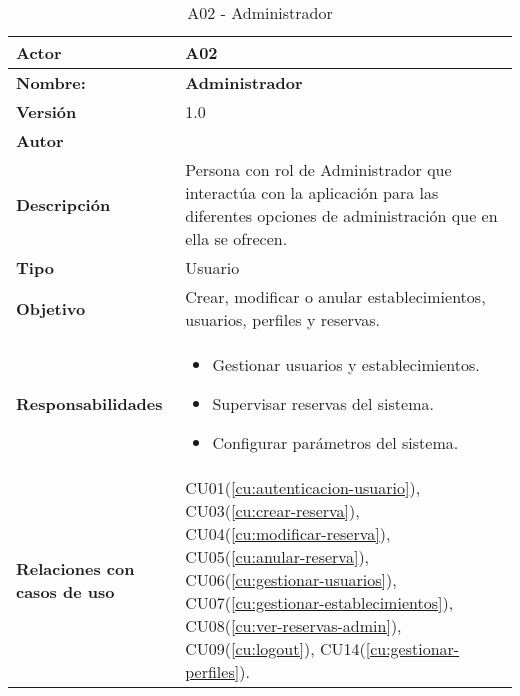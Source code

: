 \begin{table}[H]
	\centering
	\begin{tabularx}{\linewidth}{ p{} p{} }
		\toprule
		\textbf{Actor}    & A02 \\
		\toprule
		\textbf{Nombre:} 			  & \textbf{Administrador} \\
		\textbf{Versión}              & 1.0    \\
		\textbf{Autor}                & \nombre \\
		\textbf{Descripción}          & Persona con rol de Administrador que interactúa con la aplicación para las diferentes opciones de administración que en ella se ofrecen. \\
		\textbf{Tipo}                 & Usuario \\
		\textbf{Objetivo}             & Crear, modificar o anular establecimientos, usuarios, perfiles y reservas. \\
		\textbf{Responsabilidades}    & 
		\begin{itemize}
			\tightlist
			\item Gestionar usuarios y establecimientos.
			\item Supervisar reservas del sistema.
			\item Configurar parámetros del sistema.
		\end{itemize}\\
		\textbf{Relaciones con casos de uso} & CU01(\ref{cu:autenticacion-usuario}), CU03(\ref{cu:crear-reserva}), CU04(\ref{cu:modificar-reserva}), CU05(\ref{cu:anular-reserva}), CU06(\ref{cu:gestionar-usuarios}), CU07(\ref{cu:gestionar-establecimientos}), CU08(\ref{cu:ver-reservas-admin}), CU09(\ref{cu:logout}), CU14(\ref{cu:gestionar-perfiles}). \\
		\bottomrule
	\end{tabularx}
	\caption{A02 - Administrador}
	\label{actor:administrador}
\end{table}


